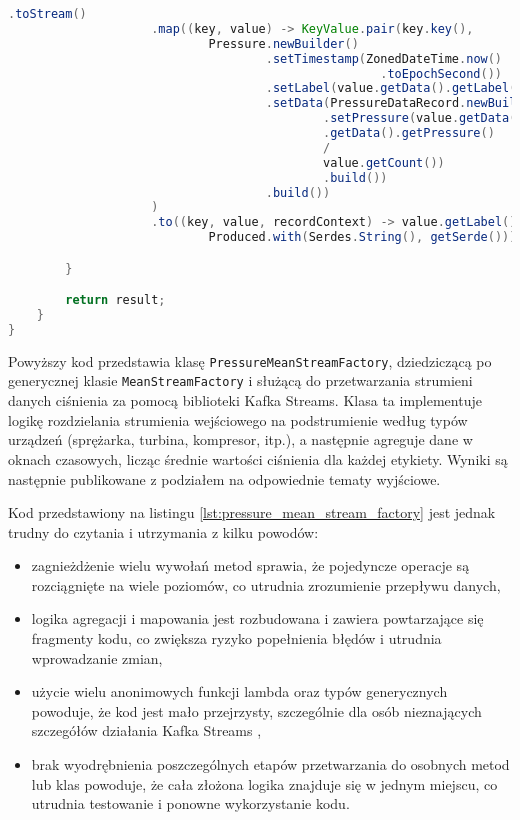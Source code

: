 \begin{lstlisting}[caption=Poprzednia implementacja przetwarzająca strumienie danych, label={lst:pressure_mean_stream_factory},language=Java]
                    .toStream()
                    .map((key, value) -> KeyValue.pair(key.key(),
                            Pressure.newBuilder()
                                    .setTimestamp(ZonedDateTime.now()
                                                    .toEpochSecond())
                                    .setLabel(value.getData().getLabel())
                                    .setData(PressureDataRecord.newBuilder()
                                            .setPressure(value.getData()
                                            .getData().getPressure() 
                                            / 
                                            value.getCount())
                                            .build())
                                    .build())
                    )
                    .to((key, value, recordContext) -> value.getLabel().toString() + getOutputTopicsPostfix(),
                            Produced.with(Serdes.String(), getSerde()));

        }

        return result;
    }
}  

\end{lstlisting}

Powyższy kod przedstawia klasę \texttt{PressureMeanStreamFactory}, dziedziczącą po generycznej klasie \texttt{MeanStreamFactory} i służącą do przetwarzania strumieni danych ciśnienia za pomocą biblioteki Kafka Streams. Klasa ta implementuje logikę rozdzielania strumienia wejściowego na podstrumienie według typów urządzeń (sprężarka, turbina, kompresor, itp.), a następnie agreguje dane w oknach czasowych, licząc średnie wartości ciśnienia dla każdej etykiety. Wyniki są następnie publikowane z podziałem na odpowiednie tematy wyjściowe.

\vspace{0.3em}

Kod przedstawiony na listingu \ref{lst:pressure_mean_stream_factory} jest jednak trudny do czytania i utrzymania z kilku powodów:
\begin{itemize}
    \item zagnieżdżenie wielu wywołań metod sprawia, że pojedyncze operacje są rozciągnięte na wiele poziomów, co utrudnia zrozumienie przepływu danych,
    \item logika agregacji i mapowania jest rozbudowana i zawiera powtarzające się fragmenty kodu, co zwiększa ryzyko popełnienia błędów i utrudnia wprowadzanie zmian,
    \item użycie wielu anonimowych funkcji lambda oraz typów generycznych powoduje, że kod jest mało przejrzysty, szczególnie dla osób nieznających szczegółów działania Kafka Streams \cite{kafka_streams},
    \item brak wyodrębnienia poszczególnych etapów przetwarzania do osobnych metod lub klas powoduje, że cała złożona logika znajduje się w jednym miejscu, co utrudnia testowanie i ponowne wykorzystanie kodu.
\end{itemize}

